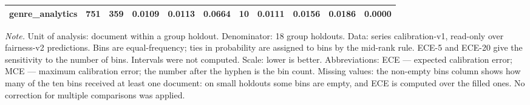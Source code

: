 \begin{table}
\begin{tabular}{lllllllllll}
genre\_analytics & 751 & 359 & 0.0109 & 0.0113 & 0.0664 & 10 & 0.0111 & 0.0156 & 0.0186 & 0.0000 \\
\bottomrule
\end{tabular}
\begin{minipage}{\linewidth}\footnotesize\vspace{2pt}
\textit{Note.} Unit of analysis: document within a group holdout. Denominator: 18 group holdouts. Data: series calibration-v1, read-only over fairness-v2 predictions. Bins are equal-frequency; ties in probability are assigned to bins by the mid-rank rule. ECE-5 and ECE-20 give the sensitivity to the number of bins. Intervals were not computed. Scale: lower is better. Abbreviations: ECE — expected calibration error; MCE — maximum calibration error; the number after the hyphen is the bin count. Missing values: the non-empty bins column shows how many of the ten bins received at least one document: on small holdouts some bins are empty, and ECE is computed over the filled ones. No correction for multiple comparisons was applied.
\end{minipage}
\end{table}
